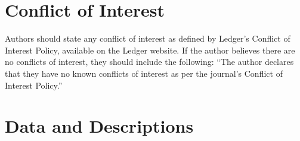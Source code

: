 \documentclass{ledger}
\begin{document}
\section*{Conflict of Interest}

Authors should state any conflict of interest as defined by Ledger's Conflict of Interest Policy, available on the Ledger website. If the author believes there are no conflicts of interest, they should include the following: ``The author declares that they have no known conflicts of interest as per the journal’s Conflict of Interest Policy.''







\newpage 	

\appendix
\setcounter{section}{0}
\section{Data and Descriptions}

\vspace{12pt}
\begin{table}[h]
\begin{center} 



\caption{A table in an appendix} \label{AppendixTable}
\end{center}
\end{table} 


\thispagestyle{pagelast}





\end{document}
